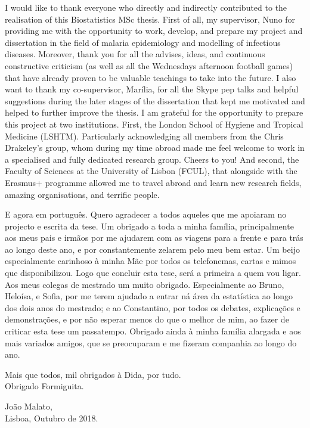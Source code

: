 


\begin{acknowledgements}

I would like to thank everyone who directly and indirectly contributed to the realisation of this Biostatistics MSc thesis.
First of all, my supervisor, Nuno for providing me with the opportunity to work, develop, and prepare my project and dissertation in the field of malaria epidemiology and modelling of infectious diseases.
Moreover, thank you for all the advises, ideas, and continuous constructive criticism (as well as all the Wednesdays afternoon football games) that have already proven to be valuable teachings to take into the future.
I also want to thank my co-supervisor, Marília, for all the Skype pep talks and helpful suggestions during the later stages of the dissertation that kept me motivated and helped to further improve the thesis.
I am grateful for the opportunity to prepare this project at two institutions.
First, the London School of Hygiene and Tropical Medicine (LSHTM). Particularly acknowledging all members from the Chris Drakeley's group, whom during my time abroad made me feel welcome to work in a specialised and fully dedicated research group. Cheers to you!
And second, the Faculty of Sciences at the University of Lisbon (FCUL), that alongside with the Erasmus+ programme allowed me to travel abroad and learn new research fields, amazing organisations, and terrific people.

E agora em português.
Quero agradecer a todos aqueles que me apoiaram no projecto e escrita da tese.
Um obrigado a toda a minha família, principalmente aos meus pais e irmãos por me ajudarem com as viagens para a frente e para trás ao longo deste ano, e por constantemente zelarem pelo meu bem estar.
Um beijo especialmente carinhoso à minha Mãe por todos os telefonemas, cartas e mimos que disponibilizou.
Logo que concluir esta tese, será a primeira a quem vou ligar.
Aos meus colegas de mestrado um muito obrigado.
Especialmente ao Bruno, Heloísa, e Sofia, por me terem ajudado a entrar ná área da estatística ao longo dos dois anos do mestrado; e ao Constantino, por todos os debates, explicações e demonstrações, e por não esperar menos do que o melhor de mim, ao fazer de criticar esta tese um passatempo.
Obrigado ainda à minha família alargada e aos mais variados amigos, que se preocuparam e me fizeram companhia ao longo do ano.

Mais que todos, mil obrigados à Dida, por tudo.
\\
Obrigado Formiguita.

\begin{flushright}
João Malato,\\
Lisboa, Outubro de 2018.\\
\end{flushright}

\end{acknowledgements}
